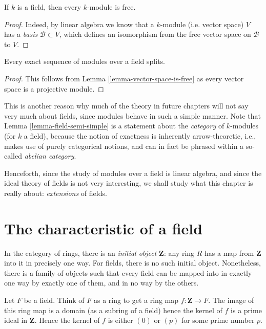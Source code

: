\begin{lemma}
\label{lemma-vector-space-is-free}
If $k$ is a field, then every $k$-module is free.
\end{lemma}

\begin{proof}
Indeed, by linear algebra we know that a $k$-module (i.e. vector space)
$V$ has a {\it basis} $\mathcal{B} \subset V$, which defines an isomorphism
from the free vector space on $\mathcal{B}$ to $V$.
\end{proof}

\begin{lemma}
\label{lemma-field-semi-simple}
Every exact sequence of modules over a field splits.
\end{lemma}

\begin{proof}
This follows from Lemma \ref{lemma-vector-space-is-free} as every vector
space is a projective module.
\end{proof}

\noindent
This is another reason why much of the theory in future chapters will not say
very much about fields, since modules behave in such a simple manner.
Note that Lemma \ref{lemma-field-semi-simple} is a statement about the
{\it category} of $k$-modules (for $k$ a field), because the notion of
exactness is inherently arrow-theoretic, i.e., makes use of purely categorical
notions, and can in fact be phrased within a so-called {\it abelian category}.

\medskip\noindent
Henceforth, since the study of modules over a field is linear algebra, and
since the ideal theory of fields is not very interesting, we shall study what
this chapter is really about: {\it extensions} of fields.


\section{The characteristic of a field}
\label{section-more-fields}

\noindent
In the category of rings, there is an {\it initial object} $\mathbf{Z}$: any
ring $R$ has a map from $\mathbf{Z}$ into it in precisely one way. For fields,
there is no such initial object.
Nonetheless, there is a family of objects such that every field can be mapped
into in exactly one way by exactly one of them, and in no way by the others.

\medskip\noindent
Let $F$ be a field. Think of $F$ as a ring to get a ring map
$f : \mathbf{Z} \to F$. The image of this ring map is a domain
(as a subring of a field) hence the kernel of $f$ is a prime ideal
in $\mathbf{Z}$. Hence the kernel of $f$ is either $(0)$ or $(p)$ for
some prime number $p$.

